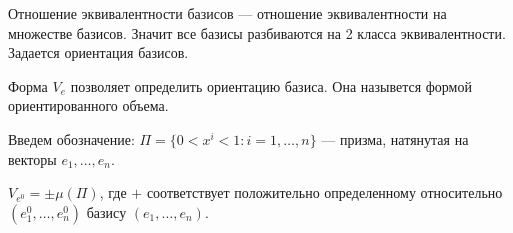 \begin{prop}
	Отношение эквивалентности базисов --- отношение эквивалентности на множестве базисов. Значит все базисы разбиваются на 2 класса эквивалентности. Задается ориентация базисов.
\end{prop}

Форма $V_e$ позволяет определить ориентацию базиса. Она назывется формой ориентированного объема.

Введем обозначение: $\Pi=\{0<x^i<1:i=1,\ldots,n\}$ --- призма, натянутая на векторы $e_1, \ldots, e_n$.

\begin{prop}
	$V_{e^0}=\pm \mu(\Pi)$, где $+$ соответствует положительно определенному относительно $(e_1^0,\ldots,e^0_n)$ базису $(e_1,\ldots, e_n)$.
\end{prop}



























